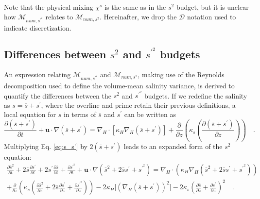 Note that the physical mixing $\chi^s$ is the same as in the $s^2$ budget, but it is unclear how $\mathcal{M}_{num, s^{\prime^2}}$ relates to $\mathcal{M}_{num, s^2}$. Hereinafter, we drop the $\mathcal{D}{}$ notation used to indicate discretization.

\subsection{Differences between $s^2$ and $s^{\prime^2}$ budgets}

An expression relating $\mathcal{M}_{num, s^{\prime^2}}$ and $\mathcal{M}_{num, s^2}$, making use of the Reynolds decomposition used to define the volume-mean salinity variance, is derived to quantify the differences between the $s^2$ and $s^{\prime^2}$ budgets. If we redefine the salinity as $s = \overline{s}+s^\prime$, where the overline and prime retain their previous definitions, a local equation for $s$ in terms of $\overline{s}$ and $s^\prime$ can be written as
\begin{equation} \label{eq:s_s'}
    \frac{\partial \left(\overline{s}+ s^\prime \right)}{\partial t}+ \textbf{u} \cdot \nabla \left(\overline{s}+ s^\prime \right) = \nabla_H \cdot \left[\kappa_H \nabla_H \left(\overline{s}+s^\prime \right) \right]+ \frac{\partial}{\partial z} \left(\kappa_s \left(\frac{\partial (\overline{s}+ s^\prime)}{\partial z} \right) \right) \quad .
\end{equation}
Multiplying Eq. \ref{eq:s_s'} by $2(\overline{s}+s^\prime)$ leads to an expanded form of the $s^2$ equation:
\begin{equation} \label{eq:s_s'_exanded}
    \begin{split}
        \frac{\partial \overline{s}^2}{\partial t} + 2\overline{s} \frac{\partial s^\prime}{\partial t} +2s^\prime \frac{\partial \overline{s}}{\partial t} + \frac{\partial s^{\prime^2}}{\partial t}+
        \textbf{u} \cdot \nabla \left(\overline{s}^2+2 \overline{s} s^\prime+s^{\prime^2} \right) = \nabla_H \cdot \left(\kappa_H \nabla_H \left(\overline{s}^2+2\overline{s}s^{\prime}+s^{\prime^2} \right) \right) \\
        + \frac{\partial}{\partial z} \left(\kappa_s \left(\frac{\partial \overline{s}^2}{\partial z} + 2\overline{s} \frac{\partial s^\prime}{\partial z} + \frac{\partial s^{\prime^2}}{\partial z} \right) \right) -2\kappa_H \big[(\nabla_H (\overline{s}+s^\prime))^2 \big]-2 \kappa_s \left(\frac{\partial \overline{s}}{\partial z} + \frac{\partial s^\prime}{\partial z} \right)^{2} \quad .
    \end{split}
\end{equation}
